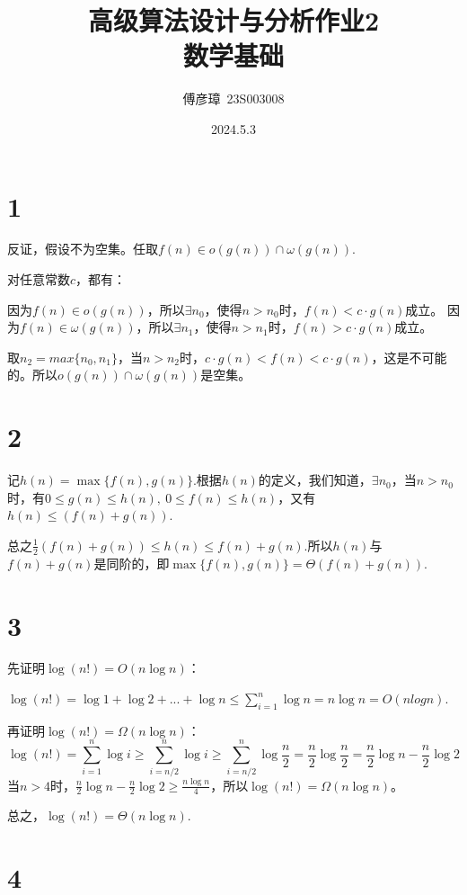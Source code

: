 \documentclass{ctexart}
\title{高级算法设计与分析作业2\\数学基础}
\author{傅彦璋\ 23S003008}
\date{2024.5.3}
\begin{document}
\maketitle


\section*{1}
反证，假设不为空集。任取$f(n)\in o(g(n)) \cap \omega(g(n)) $.

对任意常数$c$，都有：

因为$f(n)\in o(g(n))$，所以$\exists n_0 $，使得$n>n_0$时，$f(n)<c\cdot g(n)$成立。
因为$f(n)\in \omega(g(n))$，所以$\exists n_1 $，使得$n>n_1$时，$f(n)>c\cdot g(n)$成立。

取$n_2 = max\{n_0,n_1\}$，当$n>n_2$时，$c\cdot g(n)<f(n)<c\cdot g(n)$，这是不可能的。所以$o(g(n)) \cap \omega(g(n)) $是空集。

\section*{2}

记$h(n)=\max \{f(n),g(n)\}$.根据$h(n)$的定义，我们知道，$\exists n_0$，当$n>n_0$时，有$0\le g(n)\le h(n),\ 0\le f(n)\le h(n)$，又有$h(n)\le (f(n)+g(n))$.

总之$\frac{1}{2}\left( f(n)+g(n) \right) \le h(n) \le f(n)+g(n)$.所以$h(n)$与$f(n)+g(n)$是同阶的，即$\max \{f(n),g(n)\} = \Theta(f(n)+g(n))$.


\section*{3}

先证明$\log (n!) = O(n\log n)$：

$\log(n!) = \log 1 + \log 2 + ... + \log n \le \sum_{i=1}^{n}\log n = n\log n = O(n log n)$.

再证明$\log (n!) = \Omega(n\log n)$：
$$
\log (n!) = \sum_{i=1}^n \log i \ge \sum_{i=n/2}^n \log i \ge \sum_{i=n/2}^n \log \frac{n}{2} = \frac{n}{2}\log \frac{n}{2} = \frac{n}{2}\log n - \frac{n}{2}\log 2
$$
当$n>4$时，$\frac{n}{2}\log n - \frac{n}{2}\log 2 \ge \frac{n\log n}{4}$，所以$\log (n!) = \Omega(n\log n)$。

总之，$\log (n!) = \Theta(n\log n)$.



\section*{4}
\end{document}
